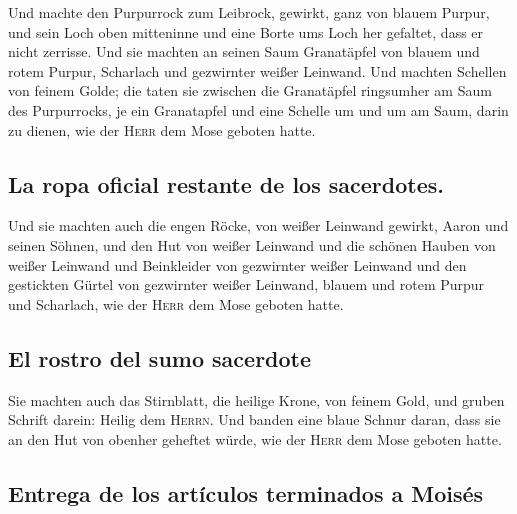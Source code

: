  Und machte den Purpurrock zum Leibrock, gewirkt, ganz
von blauem Purpur,  und sein Loch oben mitteninne und
eine Borte ums Loch her gefaltet, dass er nicht zerrisse.
 Und sie machten an seinen Saum Granatäpfel von blauem
und rotem Purpur, Scharlach und gezwirnter weißer Leinwand.
 Und machten Schellen von feinem Golde; die taten sie
zwischen die Granatäpfel ringsumher am Saum des Purpurrocks,
 je ein Granatapfel und eine Schelle um und um am Saum,
darin zu dienen, wie der \textsc{Herr} dem Mose geboten hatte.

\hypertarget{la-ropa-oficial-restante-de-los-sacerdotes.}{%
\subsection{La ropa oficial restante de los
sacerdotes.}\label{la-ropa-oficial-restante-de-los-sacerdotes.}}

 Und sie machten auch die engen Röcke, von weißer
Leinwand gewirkt, Aaron und seinen Söhnen,  und den Hut
von weißer Leinwand und die schönen Hauben von weißer Leinwand und
Beinkleider von gezwirnter weißer Leinwand  und den
gestickten Gürtel von gezwirnter weißer Leinwand, blauem und rotem
Purpur und Scharlach, wie der \textsc{Herr} dem Mose geboten hatte.

\hypertarget{el-rostro-del-sumo-sacerdote}{%
\subsection{El rostro del sumo
sacerdote}\label{el-rostro-del-sumo-sacerdote}}

 Sie machten auch das Stirnblatt, die heilige Krone, von
feinem Gold, und gruben Schrift darein: Heilig dem \textsc{Herrn}.
 Und banden eine blaue Schnur daran, dass sie an den Hut
von obenher geheftet würde, wie der \textsc{Herr} dem Mose geboten
hatte.

\hypertarget{entrega-de-los-artuxedculos-terminados-a-moisuxe9s}{%
\subsection{Entrega de los artículos terminados a
Moisés}\label{entrega-de-los-artuxedculos-terminados-a-moisuxe9s}}

